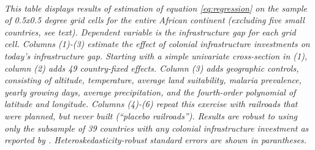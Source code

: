 \documentclass[11pt, oneside]{article}   	%
\begin{document}
\begin{table}[] \centering
  \caption{Colonial Railroads and Infrastructure Gap}
  \label{RailKM_zeta}

\justify
\textit{\\ \footnotesize This table displays results of estimation of equation \ref{eq:regression} on the sample of 0.5x0.5 degree grid cells for the entire African continent (excluding five small countries, see text). Dependent variable is the infrastructure gap for each grid cell. Columns (1)-(3) estimate the effect of colonial infrastructure investments on today's infrastructure gap. Starting with a simple univariate cross-section in (1), column (2) adds 49 country-fixed effects. Column (3) adds geographic controls, consisting of altitude, temperature, average land suitability, malaria prevalence, yearly growing days, average precipitation, and the fourth-order polynomial of latitude and longitude. Columns (4)-(6) repeat this exercise with railroads that were planned, but never built (``placebo railroads''). Results are robust to using only the subsample of 39 countries with any colonial infrastructure investment as reported by \cite{jedwab_permanent_2016}. Heteroskedasticity-robust standard errors are shown in parantheses.}
\end{table}
\end{document}
